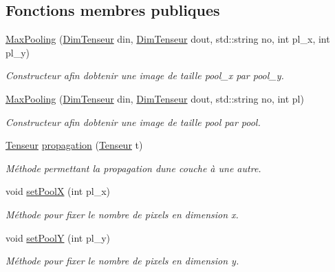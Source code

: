 \subsection*{Fonctions membres publiques}
\begin{DoxyCompactItemize}
\item 
\mbox{\label{class_max_pooling_aa26ff6fb01b361da3e57dfe77131a20a}} 
\hyperlink{class_max_pooling_aa26ff6fb01b361da3e57dfe77131a20a}{Max\+Pooling} (\hyperlink{class_dim_tenseur}{Dim\+Tenseur} din, \hyperlink{class_dim_tenseur}{Dim\+Tenseur} dout, std\+::string no, int pl\+\_\+x, int pl\+\_\+y)
\begin{DoxyCompactList}\small\item\em Constructeur afin d\textquotesingle{}obtenir une image de taille pool\+\_\+x par pool\+\_\+y. \end{DoxyCompactList}\item 
\mbox{\label{class_max_pooling_a49e6a67705aacebcc8a58a4d73cd7c58}} 
\hyperlink{class_max_pooling_a49e6a67705aacebcc8a58a4d73cd7c58}{Max\+Pooling} (\hyperlink{class_dim_tenseur}{Dim\+Tenseur} din, \hyperlink{class_dim_tenseur}{Dim\+Tenseur} dout, std\+::string no, int pl)
\begin{DoxyCompactList}\small\item\em Constructeur afin d\textquotesingle{}obtenir une image de taille pool par pool. \end{DoxyCompactList}\item 
\hyperlink{class_tenseur}{Tenseur} \hyperlink{class_max_pooling_a48e0258bf1f949853cfceb2726035fb8}{propagation} (\hyperlink{class_tenseur}{Tenseur} t)
\begin{DoxyCompactList}\small\item\em Méthode permettant la propagation d\textquotesingle{}une couche à une autre. \end{DoxyCompactList}\item 
void \hyperlink{class_max_pooling_ae70dd14b2ebe5963b3a6904ca86857bc}{set\+PoolX} (int pl\+\_\+x)
\begin{DoxyCompactList}\small\item\em Méthode pour fixer le nombre de pixels en dimension x. \end{DoxyCompactList}\item 
void \hyperlink{class_max_pooling_abf21b8f9da67780af60a588a543f7a1b}{set\+PoolY} (int pl\+\_\+y)
\begin{DoxyCompactList}\small\item\em Méthode pour fixer le nombre de pixels en dimension y. \end{DoxyCompactList}\item 

\end{DoxyCompactItemize}
